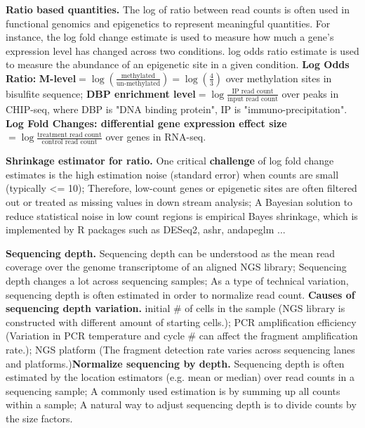 \vspace{0.1em}\noindent
\textbf{Ratio based quantities.} The log of ratio between read counts is often used in functional genomics and epigenetics to represent meaningful quantities. For instance, the log fold change estimate is used to measure how much a gene's expression level has changed across two conditions. log odds ratio estimate is used to measure the abundance of an epigenetic site in a given condition. \textbf{Log Odds Ratio:} \textbf{M-level}$=\log(\frac{\text{methylated}}{\text{un-methylated}})=\log(\frac{4}{3})$ over methylation sites in bisulfite sequence; \textbf{DBP enrichment level}$=\log\frac{\text{IP read count}}{\text{input read count}}$ over peaks in CHIP-seq, where DBP is "DNA binding protein", IP is "immuno-precipitation". \textbf{Log Fold Changes: differential gene expression effect size}$=\log\frac{\text{treatment read count}}{\text{control read count}}$ over genes in RNA-seq.

\vspace{0.1em}\noindent
\textbf{Shrinkage estimator for ratio.} One critical \textbf{challenge} of log fold change estimates is the high estimation noise (standard error) when counts are small (typically <= 10); Therefore, low-count genes or epigenetic sites are often filtered out or treated as missing values in down stream analysis; A Bayesian solution to reduce statistical noise in low count regions is empirical Bayes shrinkage, which is implemented by R packages such as DESeq2, ashr, andapeglm ...

\vspace{0.1em}\noindent
\textbf{Sequencing depth.} Sequencing depth can be understood as the mean read coverage over the genome \/ transcriptome of an aligned NGS library; Sequencing depth changes a lot across sequencing samples; As a type of technical variation, sequencing depth is often estimated in order to normalize read count. \textbf{Causes of sequencing depth variation.} initial \# of cells in the sample (NGS library is constructed with different amount of starting cells.); PCR amplification efficiency (Variation in PCR temperature and cycle \# can affect the fragment amplification rate.); NGS platform (The fragment detection rate varies across sequencing lanes and platforms.)\textbf{Normalize sequencing by depth.} Sequencing depth is often estimated by the location estimators (e.g. mean or median) over read counts in a sequencing sample; A commonly used estimation is by summing up all counts within a sample; A natural way to adjust sequencing depth is to divide counts by the size factors.

